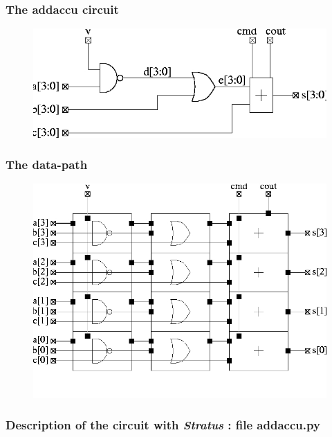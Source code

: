 \subsubsection{The addaccu circuit}

\begin{figure}[h!]
\centering
\includegraphics[width=.9\textwidth]{./images/add1}
\end{figure}
  
\newpage
\subsubsection{The data-path}

\begin{figure}[h!]
\centering
\includegraphics[width=.9\textwidth]{./images/add2}
\end{figure}

\newpage
\subsubsection{Description of the circuit with \emph{Stratus} : file addaccu.py}

